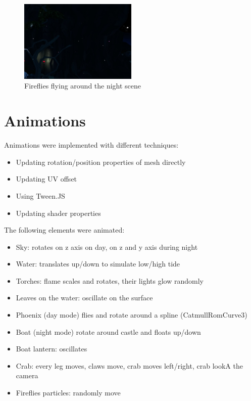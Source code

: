 \documentclass[10pt,a4paper]{article}
\begin{document}
\begin{center}
\begin{figure}[H]
  \includegraphics[width=0.5\textwidth]{fireflies}
     \caption{Fireflies flying around the night scene}
\end{figure}
\end{center}


\section{Animations}

Animations were implemented with different techniques:

\begin{itemize}
 \item Updating rotation/position properties of mesh directly
 \item Updating UV offset
 \item Using Tween.JS
 \item Updating shader properties
\end{itemize}

\bigbreak

The following elements were animated:
\begin{itemize}
 \item Sky: rotates on z axis on day, on z and y axis during night
 \item Water: translates up/down to simulate low/high tide
 \item Torches: flame scales and rotates, their lights glow randomly
 \item Leaves on the water: oscillate on the surface
 \item Phoenix (day mode) flies and rotate around a spline (CatmullRomCurve3)
 \item Boat (night mode) rotate around castle and floats up/down
 \item Boat lantern: oscillates
 \item Crab: every leg moves, claws move, crab moves left/right, crab lookA the camera
 \item Fireflies particles: randomly move
 \end{itemize}
\end{document}
